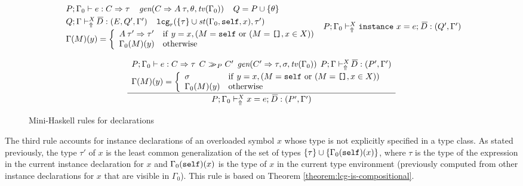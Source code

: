 \begin{figure}
\[\begin{array}{cc}
{\begin{array}{l}
            P; \Gamma_0 \vdash e : C \Rightarrow \tau \:\:\:\:\:
            \mbox{\it gen}(C \Rightarrow A \:\tau, \theta, {\it tv\/}(\Gamma_0)) \:\:\:\:\:
            Q = P \cup \{ \theta \} \\[.1cm] 
            Q;\Gamma \vdash_{\Uparrow}^X \overline{\!D} : (E,Q',\Gamma') \:\:\:\:\:
            {\tt lcg}_r(\{ \tau\} \cup \mathit{st\/}(\Gamma_0, \mathtt{self}, x),\tau')  \\[.1cm]
           \Gamma(M)(y) = \left\{ \begin{array}{ll}
                                      A\: \tau' \Rightarrow \tau' & \mathrm{ if\ } y = x, (M = \mathtt{self}{\rm\ or\ }
                                                                 (M = \mbox{\tt{[]}}, x \in X)) \\
                                      \Gamma_0(M)(y) & \mathrm{ otherwise } 
                                   \end{array}\right.
          \end{array}}
	 {P;\Gamma_0 \vdash_{\Uparrow}^X {\tt instance}\ x = e;\: \overline{\!D} : (Q',\Gamma')} \\\ \\

	\displaystyle\frac
	 {\begin{array}{l}
             P;\Gamma_0 \vdash e : C\Rightarrow\tau \:\: C >\!\!\!>_{P} C' \:\:
             \mbox{\it gen}(C'\Rightarrow\tau,\sigma,{\it tv\/}(\Gamma_0)) \:\:
           P;\Gamma \vdash_{\Uparrow}^X \overline{\!D} : (P',\Gamma')\\[.1cm]
           \Gamma(M)(y) = \left\{ \begin{array}{ll}
                                    \sigma & \mathrm{if\ } y = x, (M = \mathtt{self}\ \mathrm{ or\ }
                                                                 (M = \mbox{\tt{[]}}, x \in X)) \\
                                      \Gamma_0(M)(y) & \mathrm{ otherwise } 
                                   \end{array}\right.
          \end{array}}
	 {P;\Gamma_0 \vdash_{\Uparrow}^X x = e;\: \overline{\!D} : (P',\Gamma')} 
\end{array} \]
\caption{Mini-Haskell rules for declarations}
\label{fig:mini-haskell-rules-for-declarations}
\end{figure}

The third rule accounts for instance declarations of an overloaded
symbol $x$ whose type is not explicitly specified in a type class. As
stated previously, the type $\tau'$ of $x$ is the least common
generalization of the set of types $\{\tau\} \cup
\{\Gamma_0(\mathtt{self})(x)\}$, where $\tau$ is the type of the expression in
the current instance declaration for $x$ and $\Gamma_0(\mathtt{self})(x)$ is
the type of $x$ in the current type environment (previously computed
from other instance declarations for $x$ that are visible in
$\Gamma_0$). This rule is based on Theorem
\ref{theorem:lcg-is-compositional}.

